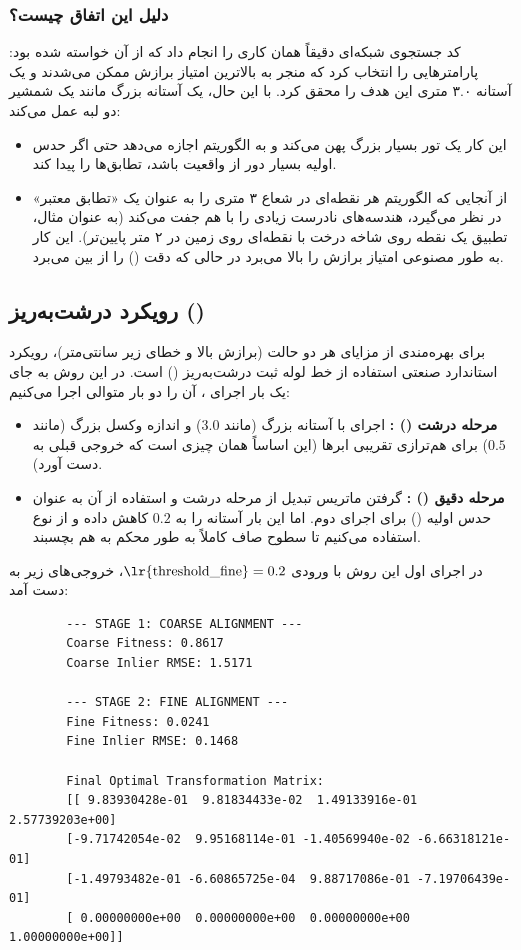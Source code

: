 \documentclass[12pt,a4paper]{article}
\begin{document}
\subsubsection*{دلیل این اتفاق چیست؟}
کد جستجوی شبکه‌ای دقیقاً همان کاری را انجام داد که از آن خواسته شده بود: پارامترهایی را انتخاب کرد که منجر به بالاترین امتیاز برازش ممکن می‌شدند و یک آستانه ۳.۰ متری این هدف را محقق کرد. با این حال، یک آستانه بزرگ مانند یک شمشیر دو لبه عمل می‌کند:
\begin{itemize}
	\item این کار یک تور بسیار بزرگ پهن می‌کند و به الگوریتم اجازه می‌دهد حتی اگر حدس اولیه بسیار دور از واقعیت باشد، تطابق‌ها را پیدا کند.
	\item از آنجایی که الگوریتم هر نقطه‌ای در شعاع ۳ متری را به عنوان یک «تطابق معتبر» در نظر می‌گیرد، هندسه‌های نادرست زیادی را با هم جفت می‌کند (به عنوان مثال، تطبیق یک نقطه روی شاخه درخت با نقطه‌ای روی زمین در ۲ متر پایین‌تر). این کار به طور مصنوعی امتیاز برازش را بالا می‌برد در حالی که دقت () را از بین می‌برد.
\end{itemize}

\subsection{رویکرد درشت‌به‌ریز ()}
برای بهره‌مندی از مزایای هر دو حالت (برازش بالا و خطای  زیر سانتی‌متر)، رویکرد استاندارد صنعتی استفاده از خط لوله ثبت درشت‌به‌ریز () است. در این روش به جای یک بار اجرای ، آن را دو بار متوالی اجرا می‌کنیم:
\begin{itemize}
	\item \textbf{مرحله درشت () :} اجرای  با آستانه بزرگ (مانند $3.0$) و اندازه وکسل بزرگ (مانند $0.5$) برای هم‌ترازی تقریبی ابرها (این اساساً همان چیزی است که خروجی قبلی به دست آورد).
	\item \textbf{مرحله دقیق () :} گرفتن ماتریس تبدیل از مرحله درشت و استفاده از آن به عنوان حدس اولیه () برای اجرای دوم. اما این بار آستانه را به $0.2$ کاهش داده و از نوع  استفاده می‌کنیم تا سطوح صاف کاملاً به طور محکم به هم بچسبند.
\end{itemize}

در اجرای اول این روش با ورودی $\text{\lr{threshold\_fine}} = 0.2$، خروجی‌های زیر به دست آمد:

\begin{latin}
	\begin{verbatim}
		--- STAGE 1: COARSE ALIGNMENT ---
		Coarse Fitness: 0.8617
		Coarse Inlier RMSE: 1.5171
		
		--- STAGE 2: FINE ALIGNMENT ---
		Fine Fitness: 0.0241
		Fine Inlier RMSE: 0.1468
		
		Final Optimal Transformation Matrix:
		[[ 9.83930428e-01  9.81834433e-02  1.49133916e-01  2.57739203e+00]
		[-9.71742054e-02  9.95168114e-01 -1.40569940e-02 -6.66318121e-01]
		[-1.49793482e-01 -6.60865725e-04  9.88717086e-01 -7.19706439e-01]
		[ 0.00000000e+00  0.00000000e+00  0.00000000e+00  1.00000000e+00]]
	\end{verbatim}
\end{latin}
\end{document}
